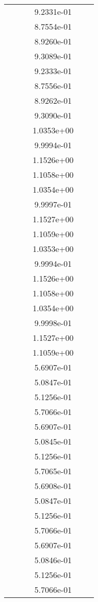 \begin{xltabular}{\textwidth}{r|rS[table-format=1.3e+2]S[table-format=1.4e+2]S[table-format=1.4e+2]S[table-format=-1.5]}
&  &  & 9.2331e-01 & & \\
&  &  & 8.7554e-01 & & \\
&  &  & 8.9260e-01 & & \\
&  &  & 9.3089e-01 & & \\
&  &  & 9.2333e-01 & & \\
&  &  & 8.7556e-01 & & \\
&  &  & 8.9262e-01 & & \\
&  &  & 9.3090e-01 & & \\
&  &  & 1.0353e+00 & & \\
&  &  & 9.9994e-01 & & \\
&  &  & 1.1526e+00 & & \\
&  &  & 1.1058e+00 & & \\
&  &  & 1.0354e+00 & & \\
&  &  & 9.9997e-01 & & \\
&  &  & 1.1527e+00 & & \\
&  &  & 1.1059e+00 & & \\
&  &  & 1.0353e+00 & & \\
&  &  & 9.9994e-01 & & \\
&  &  & 1.1526e+00 & & \\
&  &  & 1.1058e+00 & & \\
&  &  & 1.0354e+00 & & \\
&  &  & 9.9998e-01 & & \\
&  &  & 1.1527e+00 & & \\
&  &  & 1.1059e+00 & & \\
&  &  & 5.6907e-01 & & \\
&  &  & 5.0847e-01 & & \\
&  &  & 5.1256e-01 & & \\
&  &  & 5.7066e-01 & & \\
&  &  & 5.6907e-01 & & \\
&  &  & 5.0845e-01 & & \\
&  &  & 5.1256e-01 & & \\
&  &  & 5.7065e-01 & & \\
&  &  & 5.6908e-01 & & \\
&  &  & 5.0847e-01 & & \\
&  &  & 5.1256e-01 & & \\
&  &  & 5.7066e-01 & & \\
&  &  & 5.6907e-01 & & \\
&  &  & 5.0846e-01 & & \\
&  &  & 5.1256e-01 & & \\
&  &  & 5.7066e-01 & & \\

\end{xltabular}
